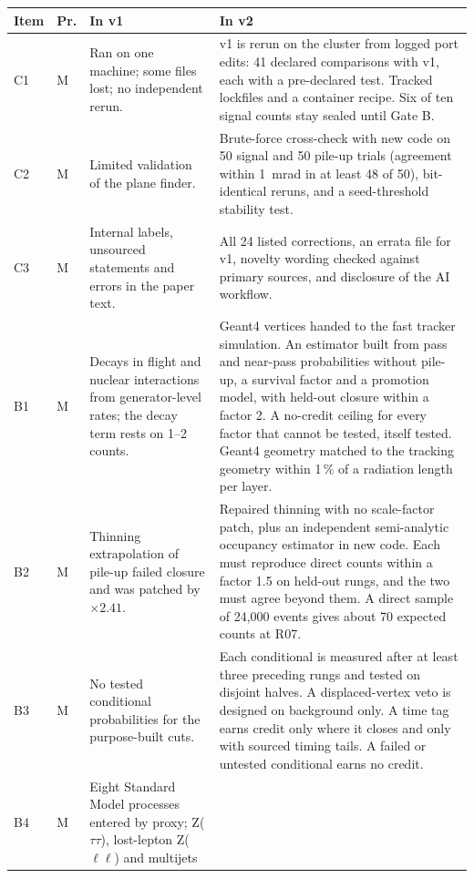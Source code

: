 \documentclass[11pt,a4paper]{article}
\begin{document}
\begin{longtable}{L{1.0cm}L{0.5cm}L{5.4cm}L{7.6cm}}
\toprule
Item & Pr. & In v1 & In v2 \\
\midrule
\endhead
\bottomrule
\endfoot
C1 & M & Ran on one machine; some files lost; no independent rerun.
   & v1 is rerun on the cluster from logged port edits: 41 declared comparisons with v1, each with a
     pre-declared test. Tracked lockfiles and a container recipe. Six of ten signal counts stay sealed until Gate B. \\
C2 & M & Limited validation of the plane finder.
   & Brute-force cross-check with new code on 50 signal and 50 pile-up trials (agreement within 1~mrad in at least
     48 of 50), bit-identical reruns, and a seed-threshold stability test. \\
C3 & M & Internal labels, unsourced statements and errors in the paper text.
   & All 24 listed corrections, an errata file for v1, novelty wording checked against primary sources, and
     disclosure of the AI workflow. \\
B1 & M & Decays in flight and nuclear interactions from generator-level rates; the decay term rests on 1--2 counts.
   & Geant4 vertices handed to the fast tracker simulation. An estimator built from pass and near-pass
     probabilities without pile-up, a survival factor and a promotion model, with held-out closure within a
     factor 2. A no-credit ceiling for every factor that cannot be tested, itself tested. Geant4 geometry matched
     to the tracking geometry within 1\,\% of a radiation length per layer. \\
B2 & M & Thinning extrapolation of pile-up failed closure and was patched by $\times2.41$.
   & Repaired thinning with no scale-factor patch, plus an independent semi-analytic occupancy estimator in new
     code. Each must reproduce direct counts within a factor 1.5 on held-out rungs, and the two must agree beyond
     them. A direct sample of 24{,}000 events gives about 70 expected counts at R07. \\
B3 & M & No tested conditional probabilities for the purpose-built cuts.
   & Each conditional is measured after at least three preceding rungs and tested on disjoint halves. A
     displaced-vertex veto is designed on background only. A time tag earns credit only where it closes and only
     with sourced timing tails. A failed or untested conditional earns no credit. \\
B4 & M & Eight Standard Model processes entered by proxy; Z($\tau\tau$), lost-lepton Z($\ell\ell$) and multijets

\end{longtable}
\end{document}
